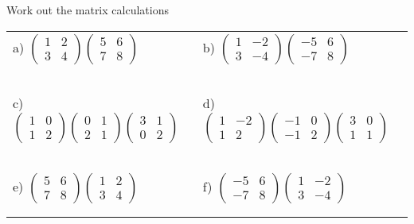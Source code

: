 \documentclass[fontsize=12pt]{scrartcl}
\begin{document}
\newpage
Work out the matrix calculations
\newline
\newline
\begin{tabular}{p{9cm}p{9cm}}
a) $\begin{pmatrix}1&2\\3&4 \end{pmatrix} \begin{pmatrix}5&6\\7&8 \end{pmatrix}$
&b) $\begin{pmatrix}1&-2\\3&-4 \end{pmatrix} \begin{pmatrix}-5&6\\-7&8 \end{pmatrix}$
\\\\\\
\\\\\\

c) $\begin{pmatrix}1&0\\1&2 \end{pmatrix} \begin{pmatrix}0&1\\2&1 \end{pmatrix} \begin{pmatrix}3&1\\0&2\end{pmatrix}$
&d) $\begin{pmatrix}1&-2\\1&2 \end{pmatrix} \begin{pmatrix}-1&0\\-1&2 \end{pmatrix} \begin{pmatrix}3&0\\1&1\end{pmatrix}$
\\\\\\
\\\\\\

e) $\begin{pmatrix}5&6\\7&8 \end{pmatrix} \begin{pmatrix}1&2\\3&4 \end{pmatrix}$
&f) $\begin{pmatrix}-5&6\\-7&8 \end{pmatrix} \begin{pmatrix}1&-2\\3&-4 \end{pmatrix}$
\\\\\\
\end{tabular}
\end{document}
